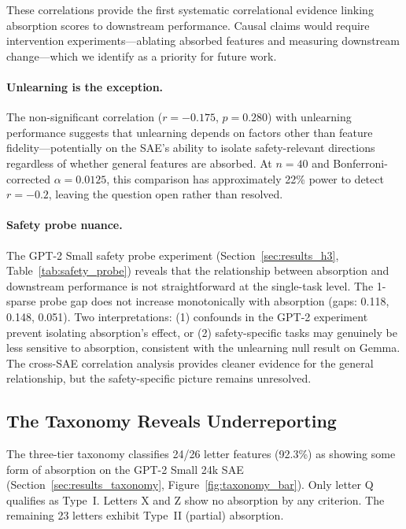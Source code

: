 \documentclass{article}
\begin{document}
These correlations provide the first systematic correlational evidence linking absorption scores to downstream performance. Causal claims would require intervention experiments---ablating absorbed features and measuring downstream change---which we identify as a priority for future work.

\paragraph{Unlearning is the exception.} The non-significant correlation ($r = -0.175$, $p = 0.280$) with unlearning performance suggests that unlearning depends on factors other than feature fidelity---potentially on the SAE's ability to isolate safety-relevant directions regardless of whether general features are absorbed. At $n = 40$ and Bonferroni-corrected $\alpha = 0.0125$, this comparison has approximately 22\% power to detect $r = -0.2$, leaving the question open rather than resolved.

\paragraph{Safety probe nuance.} The GPT-2 Small safety probe experiment (Section~\ref{sec:results_h3}, Table~\ref{tab:safety_probe}) reveals that the relationship between absorption and downstream performance is not straightforward at the single-task level. The 1-sparse probe gap does not increase monotonically with absorption (gaps: 0.118, 0.148, 0.051). Two interpretations: (1) confounds in the GPT-2 experiment prevent isolating absorption's effect, or (2) safety-specific tasks may genuinely be less sensitive to absorption, consistent with the unlearning null result on Gemma. The cross-SAE correlation analysis provides cleaner evidence for the general relationship, but the safety-specific picture remains unresolved.


\subsection{The Taxonomy Reveals Underreporting}
\label{sec:discuss_taxonomy}

The three-tier taxonomy classifies 24/26 letter features (92.3\%) as showing some form of absorption on the GPT-2 Small 24k SAE (Section~\ref{sec:results_taxonomy}, Figure~\ref{fig:taxonomy_bar}). Only letter Q qualifies as Type~I. Letters X and Z show no absorption by any criterion. The remaining 23 letters exhibit Type~II (partial) absorption.
\end{document}
